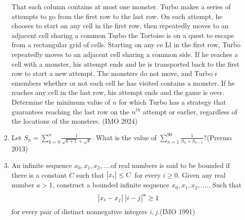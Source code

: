 \begin{enumerate}
That each column contains at most one monster.
Turbo makes a series of attempts to go from the first row to the last row. On each attempt, he chooses   to start on any cell in the first row, then repeatedly moves to an adjacent cell sharing a common Turbo the Tortoise is on a quest to escape from a rectangular grid of cells. Starting on any ce
Ll in the first row, Turbo repeatedly moves to an adjacent cell sharing a common side. If he reaches a cell with a monster, his attempt ends and he is transported back to the first row to start a new attempt. The monsters do not move, and Turbo r
emembers whether or not each cell he has visited contains a monster. If he reaches any cell in the last row, his attempt ends and the game is over.
Determine the minimum value of $ n $ for which Turbo has a strategy that guarantees reaching the last row on the  $n^{th}$ attempt or earlier, regardless of the locations of the monsters. \hfill(IMO 2024) 
\item Let
$ S_n = \sum_{k=0}^{n} \frac{1}{\sqrt{k+1} + \sqrt{k}}. $
What is the value of 
$ \sum_{n=1}^{90} \frac{1}{S_n + S_{n-1}}? $\hfill(Prermo 2013)

\item An infinite sequence $x_0, x_1, x_2,.... $of real numbers is said to be bounded if there is a constant $C$ such that $\begin{vmatrix}x_i\end{vmatrix} \leq C$ for every $i \geq 0$.
	  Given any real number $a > 1$, construct a bounded infinite sequence $x_0, x_1, x_2,.....$ Such that
	  \begin{align*}\begin{vmatrix}x_i-x_j\end{vmatrix}\begin{vmatrix}i-j\end{vmatrix}^a \geq 1 \end{align*}
	  for every pair of distinct nonnegative integers $i, j$.\hfill(IMO 1991)
\end{enumerate}

